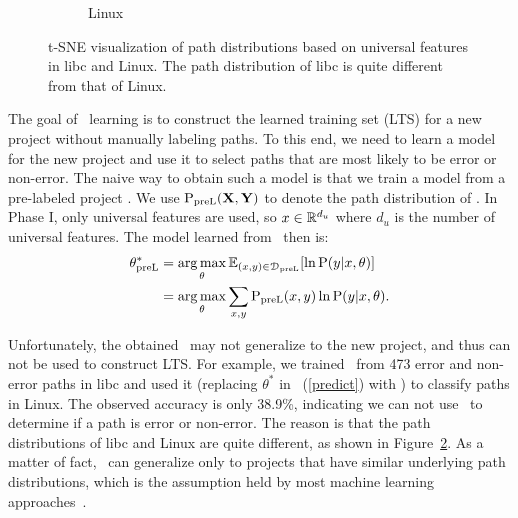 \documentclass[12pt]{report}	%
\begin{document}
\begin{figure}
\begin{subfigure}[b]{0.5\textwidth}
    \caption{Linux}
    \label{fig:distri3:linux}
\end{subfigure}
\caption[t-SNE visualization of path distributions in libc and Linux]{t-SNE visualization of path distributions based on universal features in libc and Linux.
The path distribution of libc is quite different from that of Linux.}
\label{fig:distri3}
\end{figure}

The goal of \phasef\ learning is to construct the learned training set (LTS) for a new project
without manually labeling paths.
%
To this end, we need to learn a model for the new project
and use it to select paths that are most likely to be error or non-error.
%
The naive way to obtain such a model is that
we train a model from a pre-labeled project \DS.
We use $\text{P}_\text{preL}(\mathbf{X}, \mathbf{Y})$ to denote the path distribution of \DS.
In Phase I, only universal features are used, 
so $x \in \mathbb{R}^{d_u}$ where $d_u$ is the number of universal features.
The model learned from \DS\ then is:
%
\begin{align} \label{mls}
\theta_\text{preL}^*
&= \operatorname*{arg\,max}_{\theta} \mathbb{E}_{(x, y) \in \mathcal{D}_\text{preL}}[\ln \text{P}(y | x, \theta)] \nonumber \\
&= \operatorname*{arg\,max}_{\theta} \sum_{x, y} \text{P}_\text{preL}(x, y) \ln \text{P}(y | x, \theta).
\end{align}

Unfortunately, the obtained \sm\ may not generalize to the new project,
and thus can not be used to construct LTS.
For example, we trained \sm\ from 473 error and non-error paths in libc
and used it (replacing $\theta^*$ in \eqn\ (\ref{predict}) with \sm)
to classify paths in Linux.
The observed accuracy is only 38.9\%,
indicating we can not use \sm\ to determine if a path is error or non-error.
The reason is that the path distributions of 
libc and Linux are quite different, as shown
in Figure~\ref{fig:distri3}. 
%
As a matter of fact, \sm\ can generalize only to projects 
that have similar underlying path distributions,
which is the assumption held by most machine learning approaches~\cite{murphy2012machine}.
\end{document}
